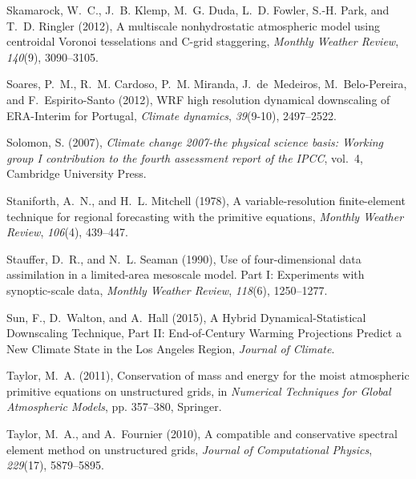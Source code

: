 \documentclass[ms,draft]{agutex}   %
\begin{document}
\begin{article}
\begin{thebibliography}{84}
Skamarock, W.~C., J.~B. Klemp, M.~G. Duda, L.~D. Fowler, S.-H. Park, and T.~D.
  Ringler (2012), {A multiscale nonhydrostatic atmospheric model using
  centroidal Voronoi tesselations and C-grid staggering}, \textit{Monthly
  Weather Review}, \textit{140}(9), 3090--3105.

Soares, P.~M., R.~M. Cardoso, P.~M. Miranda, J.~de~Medeiros, M.~Belo-Pereira,
  and F.~Espirito-Santo (2012), {WRF high resolution dynamical downscaling of
  ERA-Interim for Portugal}, \textit{Climate dynamics}, \textit{39}(9-10),
  2497--2522.

Solomon, S. (2007), \textit{Climate change 2007-the physical science basis:
  Working group I contribution to the fourth assessment report of the IPCC},
  vol.~4, Cambridge University Press.

Staniforth, A.~N., and H.~L. Mitchell (1978), A variable-resolution
  finite-element technique for regional forecasting with the primitive
  equations, \textit{Monthly Weather Review}, \textit{106}(4), 439--447.

Stauffer, D.~R., and N.~L. Seaman (1990), {Use of four-dimensional data
  assimilation in a limited-area mesoscale model. Part I: Experiments with
  synoptic-scale data}, \textit{Monthly Weather Review}, \textit{118}(6),
  1250--1277.

Sun, F., D.~Walton, and A.~Hall (2015), {A Hybrid Dynamical-Statistical
  Downscaling Technique, Part II: End-of-Century Warming Projections Predict a
  New Climate State in the Los Angeles Region}, \textit{Journal of Climate}.

Taylor, M.~A. (2011), Conservation of mass and energy for the moist atmospheric
  primitive equations on unstructured grids, in \textit{Numerical Techniques
  for Global Atmospheric Models}, pp. 357--380, Springer.

Taylor, M.~A., and A.~Fournier (2010), A compatible and conservative spectral
  element method on unstructured grids, \textit{Journal of Computational
  Physics}, \textit{229}(17), 5879--5895.


\end{thebibliography}
\end{article}
\end{document}
